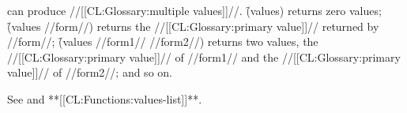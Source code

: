  can produce //[[CL:Glossary:multiple values]]//.
\f{(values)} returns zero values;
\f{(values //form//)} returns the //[[CL:Glossary:primary value]]// returned by //form//;
\f{(values //form1// //form2//)} returns two values,
    the //[[CL:Glossary:primary value]]// of //form1//
and the //[[CL:Glossary:primary value]]// of //form2//;
and so on.

See  and **[[CL:Functions:values-list]]**.




































































































